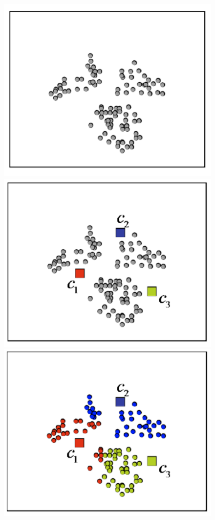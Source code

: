 \documentclass{article}
\begin{document}
\begin{figure}[H]
\centering
\includegraphics[scale=0.25]{Images/k-means-1.png}
\includegraphics[scale=0.25]{Images/k-means-2.png}
\includegraphics[scale=0.25]{Images/k-means-3.png}

\end{figure}
\end{document}
